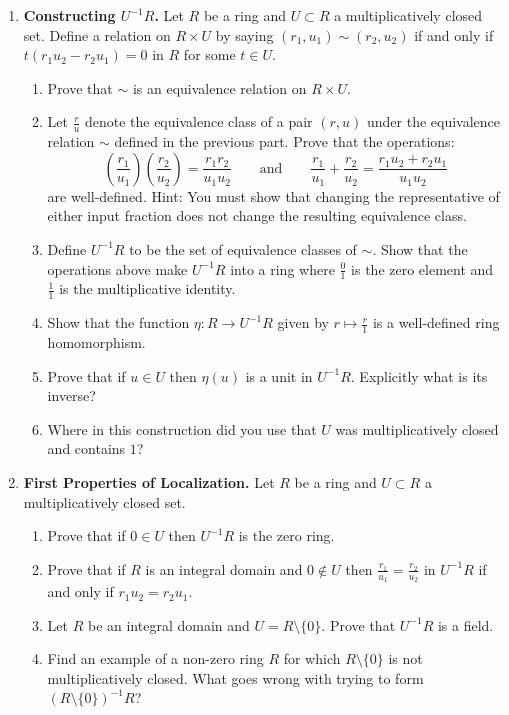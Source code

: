 \documentclass[12pt,reqno]{amsart}
\begin{document}
\begin{enumerate}[leftmargin=*]
\item\label{ex:localization-construct} \textbf{Constructing $U^{-1}R$.} Let $R$ be a ring and $U \subset R$ a multiplicatively closed set. Define a relation on $R\times U$ by saying $(r_{1},u_{1}) \sim (r_{2},u_{2})$ if and only if $t(r_1u_{2}-r_{2}u_{1})=0$ in $R$ for some $t\in U$. 
\begin{enumerate}
	\item Prove that $\sim$ is an equivalence relation on $R\times U$. 
	\item Let $\frac{r}{u}$ denote the equivalence class of a pair $(r,u)$ under the equivalence relation $\sim$ defined in the previous part. Prove that the operations:
	\[
	\left(\frac{r_{1}}{u_1}\right)\left(\frac{r_2}{u_2}\right)=\frac{r_1r_2}{u_1u_2} \quad \quad \text{and} \quad \quad \frac{r_{1}}{u_1}+\frac{r_2}{u_2} = 	\frac{r_1u_{2}+r_{2}u_{1}}{u_1u_2}
	\]
	are well-defined. Hint: You must show that changing the representative of either input fraction does not change the resulting equivalence class.
	\item Define $U^{-1}R$ to be the set of equivalence classes of $\sim$. Show that the operations above make $U^{-1}R$ into a ring where $\frac{0}{1}$ is the zero element and $\frac{1}{1}$ is the multiplicative identity. 
	\item Show that the function $\eta:R \to U^{-1}R$ given by $r\mapsto \frac{r}{1}$ is a well-defined ring homomorphism. 
	\item Prove that if $u \in U$ then $\eta(u)$ is a unit in $U^{-1}R$. Explicitly what is its inverse?
	\item Where in this construction did you use that $U$ was multiplicatively closed and contains $1$?
\end{enumerate}

 \item \textbf{First Properties of Localization.} Let $R$ be a ring and $U \subset R$ a multiplicatively closed set. 
 \begin{enumerate}
 	\item Prove that if $0 \in U$ then $U^{-1}R$ is the zero ring. 
	\item Prove that if $R$ is an integral domain and $0\not\in U$ then $\frac{r_1}{u_1}=\frac{r_2}{u_2}$ in $U^{-1}R$ if and only if $r_1u_2=r_2u_1$.
	\item Let $R$ be an integral domain and $U=R\setminus\{0\}$. Prove that $U^{-1}R$ is a field.
	\item Find an example of a non-zero ring $R$ for which $R\setminus\{0\}$ is not multiplicatively closed. What goes wrong with trying to form $(R\setminus\{0\})^{-1}R$?
\end{enumerate}


\end{enumerate}
\end{document}
